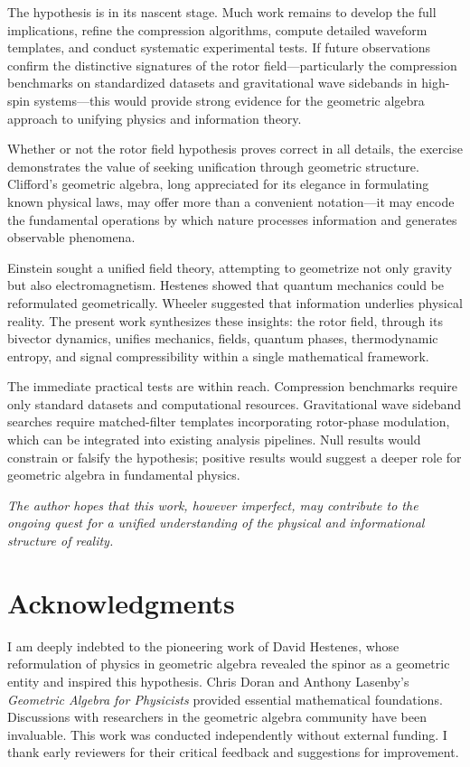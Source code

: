 \documentclass[11pt,a4paper]{article}
\theoremstyle{definition}
\theoremstyle{plain}
\theoremstyle{remark}
\begin{document}
The hypothesis is in its nascent stage. Much work remains to develop the full implications, refine the compression algorithms, compute detailed waveform templates, and conduct systematic experimental tests. If future observations confirm the distinctive signatures of the rotor field---particularly the compression benchmarks on standardized datasets and gravitational wave sidebands in high-spin systems---this would provide strong evidence for the geometric algebra approach to unifying physics and information theory.

Whether or not the rotor field hypothesis proves correct in all details, the exercise demonstrates the value of seeking unification through geometric structure. Clifford's geometric algebra, long appreciated for its elegance in formulating known physical laws, may offer more than a convenient notation---it may encode the fundamental operations by which nature processes information and generates observable phenomena.

Einstein sought a unified field theory, attempting to geometrize not only gravity but also electromagnetism. Hestenes showed that quantum mechanics could be reformulated geometrically. Wheeler suggested that information underlies physical reality. The present work synthesizes these insights: the rotor field, through its bivector dynamics, unifies mechanics, fields, quantum phases, thermodynamic entropy, and signal compressibility within a single mathematical framework.

The immediate practical tests are within reach. Compression benchmarks require only standard datasets and computational resources. Gravitational wave sideband searches require matched-filter templates incorporating rotor-phase modulation, which can be integrated into existing analysis pipelines. Null results would constrain or falsify the hypothesis; positive results would suggest a deeper role for geometric algebra in fundamental physics.

\medskip
\noindent\textit{The author hopes that this work, however imperfect, may contribute to the ongoing quest for a unified understanding of the physical and informational structure of reality.}

\vspace{1em}

\section*{Acknowledgments}

I am deeply indebted to the pioneering work of David Hestenes, whose reformulation of physics in geometric algebra revealed the spinor as a geometric entity and inspired this hypothesis. Chris Doran and Anthony Lasenby's \textit{Geometric Algebra for Physicists} provided essential mathematical foundations. Discussions with researchers in the geometric algebra community have been invaluable. This work was conducted independently without external funding. I thank early reviewers for their critical feedback and suggestions for improvement.
\end{document}
